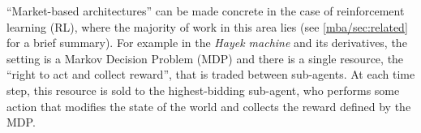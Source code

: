 

``Market-based architectures'' can be made concrete in the case of reinforcement learning (RL), where the majority of work in this area lies (see \ref{mba/sec:related} for a brief summary). For example in the \emph{Hayek machine} \cite{baumModelIntelligenceEconomy1999} and its derivatives, the setting is a Markov Decision Problem (MDP) and there is a single resource, the ``right to act and collect reward'', that is traded between sub-agents. At each time step, this resource is sold to the highest-bidding sub-agent, who performs some action that modifies the state of the world and collects the reward defined by the MDP. %

